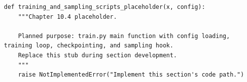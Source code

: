 \begin{lstlisting}[style=bookpython,caption={Planned code placeholder for training and sampling scripts.},label={lst:ch10-training-and-sampling-scripts}]
def training_and_sampling_scripts_placeholder(x, config):
    """Chapter 10.4 placeholder.

    Planned purpose: train.py main function with config loading, training loop, checkpointing, and sampling hook.
    Replace this stub during section development.
    """
    raise NotImplementedError("Implement this section's code path.")
\end{lstlisting}

